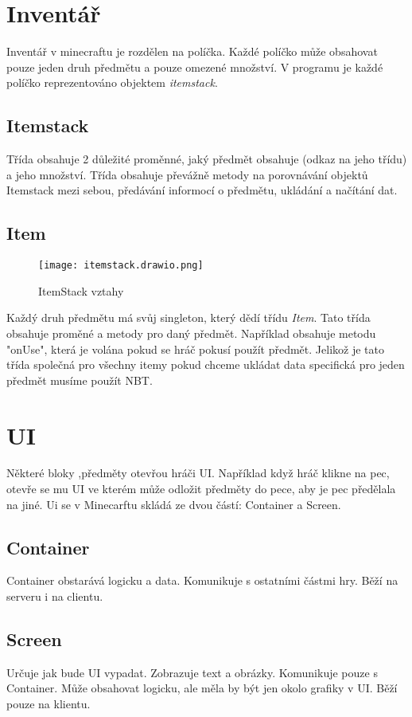 \documentclass[FM,RP]{tulthesis}
\begin{document}
\section{Inventář}
Inventář v minecraftu je rozdělen na políčka. Každé políčko může obsahovat pouze jeden druh předmětu a pouze omezené množství. V programu je každé políčko reprezentováno objektem \textit{itemstack}. 
\subsection{Itemstack}
Třída obsahuje 2 důležité proměnné, jaký předmět obsahuje (odkaz na jeho třídu) a jeho množství. Třída obsahuje převážně metody na porovnávání objektů Itemstack mezi sebou, předávání informocí o předmětu, ukládání a načítání dat.
\subsection{Item}
\begin{figure}[h]
    \centering
    \texttt{[image: itemstack.drawio.png]}
    \caption{ItemStack vztahy}
    \label{fig:enter-label}
\end{figure}
Každý druh předmětu má svůj singleton, který dědí třídu \textit{Item}. Tato třída obsahuje proměné a metody pro daný předmět. Například obsahuje metodu "onUse", která je volána pokud se hráč pokusí použít předmět. Jelikož je tato třída společná pro všechny itemy pokud chceme ukládat data specifická pro jeden předmět musíme použít NBT.


\section{UI}
Některé bloky ,předměty otevřou hráči UI. Například když hráč klikne na pec, otevře se mu UI ve kterém může odložit předměty do pece, aby je pec předělala na jiné. Ui se v Minecarftu skládá ze dvou částí: Container a Screen.
\subsection{Container}
Container obstarává logicku a data. Komunikuje s ostatními částmi hry. Běží na serveru i na  clientu.
\subsection{Screen}
Určuje jak bude UI vypadat. Zobrazuje text a obrázky. Komunikuje pouze s Container. Může obsahovat logicku, ale měla by být jen okolo grafiky v UI. Běží pouze na klientu.
\end{document}
